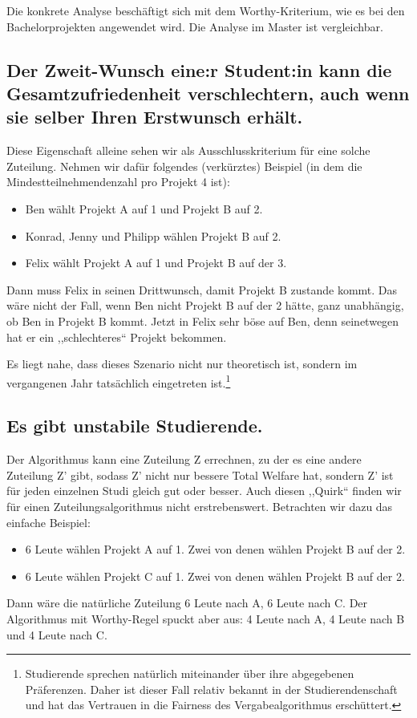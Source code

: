 \documentclass[11pt,a4paper]{article}
\begin{document}
Die konkrete Analyse beschäftigt sich mit dem Worthy-Kriterium, wie es bei den Bachelorprojekten angewendet wird. Die Analyse im Master ist vergleichbar.

\subsection{Der Zweit-Wunsch eine:r Student:in kann die Gesamtzufriedenheit verschlechtern, auch wenn sie selber Ihren Erstwunsch erhält.}
Diese Eigenschaft alleine sehen wir als Ausschlusskriterium für eine solche Zuteilung. Nehmen wir dafür folgendes (verkürztes) Beispiel (in dem die Mindestteilnehmendenzahl pro Projekt 4 ist):
\begin{itemize}[noitemsep]
    \item Ben wählt Projekt A auf 1 und Projekt B auf 2.
    \item Konrad, Jenny und Philipp wählen Projekt B auf 2.
    \item Felix wählt Projekt A auf 1 und Projekt B auf der 3. 
\end{itemize}
Dann muss Felix in seinen Drittwunsch, damit Projekt B zustande kommt. Das wäre nicht der Fall, wenn Ben nicht Projekt B auf der 2 hätte, ganz unabhängig, ob Ben in Projekt B kommt. Jetzt in Felix sehr böse auf Ben, denn seinetwegen hat er ein ,,schlechteres`` Projekt bekommen.

Es liegt nahe, dass dieses Szenario nicht nur theoretisch ist, sondern im vergangenen Jahr tatsächlich eingetreten ist.\footnote{Studierende sprechen natürlich miteinander über ihre abgegebenen Präferenzen. Daher ist dieser Fall relativ bekannt in der Studierendenschaft und hat das Vertrauen in die Fairness des Vergabealgorithmus erschüttert.}

\subsection{Es gibt unstabile Studierende.}
Der Algorithmus kann eine Zuteilung Z errechnen, zu der es eine andere Zuteilung Z' gibt, sodass Z' nicht nur bessere Total Welfare hat, sondern Z' ist für jeden einzelnen Studi gleich gut oder besser. Auch diesen ,,Quirk`` finden wir für einen Zuteilungsalgorithmus nicht erstrebenswert. Betrachten wir dazu das einfache Beispiel:
\begin{itemize}[noitemsep]
    \item 6 Leute wählen Projekt A auf 1. Zwei von denen wählen Projekt B auf der 2.
    \item 6 Leute wählen Projekt C auf 1. Zwei von denen wählen Projekt B auf der 2.
\end{itemize} 
Dann wäre die natürliche Zuteilung 6 Leute nach A, 6 Leute nach C. Der Algorithmus mit Worthy-Regel spuckt aber aus: 4 Leute nach A, 4 Leute nach B und 4 Leute nach C.
\end{document}
